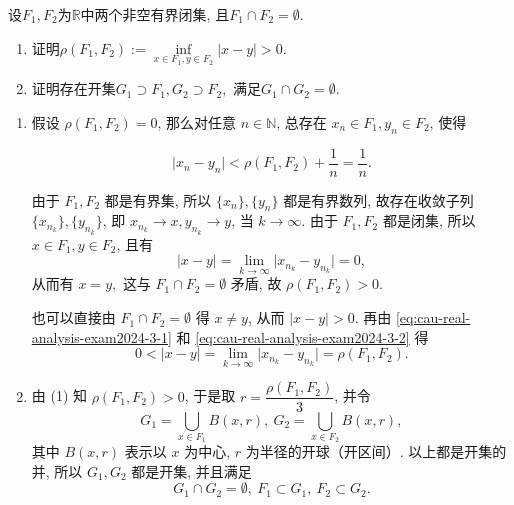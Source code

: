 
\begin{question}[points = 10]
  设$F_1, F_2$为$\mathbb{R}$中两个非空有界闭集, 且$F_1 \cap F_2 = \emptyset.$
  \begin{enumerate}
    \item 证明$\rho(F_1, F_2) := \inf\limits_{x\in F_1, y\in F_2} \lvert x - y \rvert > 0.$
    \item 证明存在开集$G_1 \supset F_1, G_2 \supset F_2,$ 满足$G_1 \cap G_2 = \emptyset.$
  \end{enumerate}

\end{question}

\begin{solution}
  \begin{enumerate}
    \item 假设 \(\rho(F_1, F_2) = 0\), 那么对任意 \(n \in \mathbb{N}\), 总存在 \(x_n \in F_1, y_n \in F_2\), 使得

    \begin{equation}
    \label{eq:cau-real-analysis-exam2024-3-1}
    \lvert x_n - y_n \rvert < \rho(F_1, F_2) + \dfrac{1}{n} = \dfrac{1}{n}.
    \end{equation}

    由于 \(F_1, F_2\) 都是有界集, 所以 \(\{x_n\}, \{y_n\}\) 都是有界数列, 故存在收敛子列 \(\{x_{n_k}\}, \{y_{n_k}\}\), 即 \(x_{n_k} \to x, y_{n_k} \to y\), 当 \(k \to \infty\). 由于 \(F_1, F_2\) 都是闭集, 所以 \(x \in F_1, y \in F_2\), 且有
    \begin{equation}
    \label{eq:cau-real-analysis-exam2024-3-2}
    \lvert x - y \rvert = \lim\limits_{k\to\infty} \lvert x_{n_k} - y_{n_k} \rvert = 0,
    \end{equation}
    从而有 \(x = y,\) 这与 \(F_1 \cap F_2 = \emptyset\) 矛盾, 故 \(\rho(F_1, F_2) > 0\).

    也可以直接由 \(F_1 \cap F_2 = \emptyset\) 得 \(x \neq y\), 从而    \(\lvert x - y \rvert > 0\). 再由 \eqref{eq:cau-real-analysis-exam2024-3-1} 和 \eqref{eq:cau-real-analysis-exam2024-3-2} 得
    \[0 < \lvert x - y \rvert = \lim\limits_{k\to\infty} \lvert x_{n_k} - y_{n_k} \rvert = \rho(F_1, F_2).\]
    \item 由 (1) 知 \(\rho(F_1, F_2) > 0\), 于是取 \(r = \dfrac{\rho(F_1, F_2)}{3}\), 并令
    \[
    G_1 = \bigcup\limits_{x\in F_1} B(x, r), ~ G_2 = \bigcup\limits_{x\in F_2} B(x, r),
    \]
    其中 \(B(x, r)\) 表示以 \(x\) 为中心, \(r\) 为半径的开球（开区间）. 以上都是开集的并, 所以 \(G_1, G_2\) 都是开集, 并且满足
    \[G_1 \cap G_2 = \emptyset, ~ F_1 \subset G_1, ~ F_2 \subset G_2.\]
  \end{enumerate}
\end{solution}

